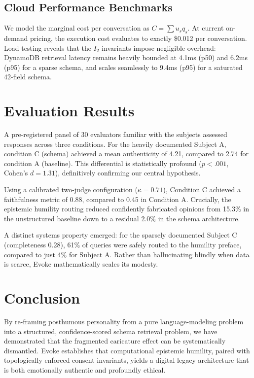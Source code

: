 \documentclass[journal]{IEEEtran}
\begin{document}
\subsection{Cloud Performance Benchmarks}
We model the marginal cost per conversation as $C = \sum u_s q_s$. At current on-demand pricing, the execution cost evaluates to exactly \$0.012 per conversation. 
Load testing reveals that the $I_2$ invariants impose negligible overhead: DynamoDB retrieval latency remains heavily bounded at 4.1ms (p50) and 6.2ms (p95) for a sparse schema, and scales seamlessly to 9.4ms (p95) for a saturated 42-field schema.

\section{Evaluation Results}
A pre-registered panel of 30 evaluators familiar with the subjects assessed responses across three conditions. For the heavily documented Subject A, condition C (schema) achieved a mean authenticity of 4.21, compared to 2.74 for condition A (baseline). This differential is statistically profound ($p < .001$, Cohen's $d = 1.31$), definitively confirming our central hypothesis. 

Using a calibrated two-judge configuration ($\kappa = 0.71$), Condition C achieved a faithfulness metric of 0.88, compared to 0.45 in Condition A. Crucially, the epistemic humility routing reduced confidently fabricated opinions from 15.3\% in the unstructured baseline down to a residual 2.0\% in the schema architecture. 

A distinct systems property emerged: for the sparsely documented Subject C (completeness 0.28), 61\% of queries were safely routed to the humility preface, compared to just 4\% for Subject A. Rather than hallucinating blindly when data is scarce, Evoke mathematically scales its modesty.

\section{Conclusion}
By re-framing posthumous personality from a pure language-modeling problem into a structured, confidence-scored schema retrieval problem, we have demonstrated that the fragmented caricature effect can be systematically dismantled. Evoke establishes that computational epistemic humility, paired with topologically enforced consent invariants, yields a digital legacy architecture that is both emotionally authentic and profoundly ethical.
\end{document}
